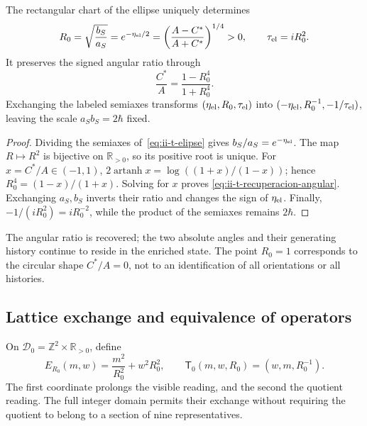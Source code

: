 \begin{proposition}
\label{prop:ii-t-radio}
The rectangular chart of the ellipse uniquely determines
\begin{equation}
 R_0=\sqrt{\frac{b_S}{a_S}}
 =e^{-\eta_{\rm el}/2}
 =\left(\frac{A-C^*}{A+C^*}\right)^{1/4}>0,
 \qquad \tau_{\rm el}=iR_0^2.
 \label{eq:ii-t-radio}
\end{equation}
It preserves the signed angular ratio through
\begin{equation}
 \frac{C^*}{A}=\frac{1-R_0^4}{1+R_0^4}.
 \label{eq:ii-t-recuperacion-angular}
\end{equation}
Exchanging the labeled semiaxes transforms
\((\eta_{\rm el},R_0,\tau_{\rm el})\) into
\((-\eta_{\rm el},R_0^{-1},-1/\tau_{\rm el})\), leaving
the scale \(a_Sb_S=2\hbar\) fixed.
\end{proposition}

\begin{proof}
Dividing the semiaxes of~\eqref{eq:ii-t-elipse} gives
\(b_S/a_S=e^{-\eta_{\rm el}}\). The map \(R\mapsto R^2\)
is bijective on \(\mathbb R_{>0}\), so its positive root is
unique. For \(x=C^*/A\in(-1,1)\),
\(2\operatorname{artanh}x=\log((1+x)/(1-x))\); hence
\(R_0^4=(1-x)/(1+x)\). Solving for \(x\) proves
\eqref{eq:ii-t-recuperacion-angular}. Exchanging \(a_S,b_S\)
inverts their ratio and changes the sign of \(\eta_{\rm el}\). Finally,
\(-1/(iR_0^2)=iR_0^{-2}\), while the product of the semiaxes
remains \(2\hbar\).
\end{proof}

The angular ratio is recovered; the two absolute angles and their generating
history continue to reside in the enriched state. The point \(R_0=1\)
corresponds to the circular shape \(C^*/A=0\), not to an identification of
all orientations or all histories.

\subsection{Lattice exchange and equivalence of operators}

\begin{definition}
\label{def:ii-t-reticular}
On \(\mathscr D_0=\mathbb Z^2\times\mathbb R_{>0}\), define
\begin{equation}
 E_{R_0}(m,w)=\frac{m^2}{R_0^2}+w^2R_0^2,\qquad
 \mathsf T_0(m,w,R_0)=(w,m,R_0^{-1}).
 \label{eq:ii-t-energia}
\end{equation}
The first coordinate prolongs the visible reading, and the second the quotient
reading. The full integer domain permits their exchange without requiring
the quotient to belong to a section of nine representatives.
\end{definition}

